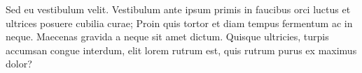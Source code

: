 	\question
	Sed eu vestibulum velit. Vestibulum ante ipsum primis in faucibus orci luctus et ultrices posuere 
	cubilia curae; Proin quis tortor et diam tempus fermentum ac in neque. Maecenas gravida a neque 
	sit amet dictum. Quisque ultricies, turpis accumsan congue interdum, elit lorem rutrum est, quis 
	rutrum purus ex maximus dolor?
\begin{solution}
	\lipsum[2]
\end{solution}